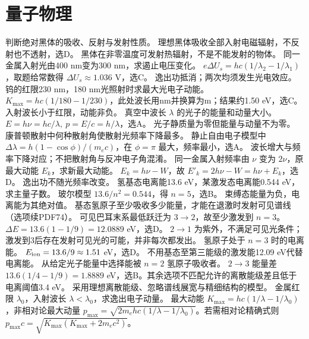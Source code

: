 \section{量子物理}
\problemtext 判断绝对黑体的吸收、反射与发射性质。
\workings 理想黑体吸收全部入射电磁辐射，不反射也不透射，选D。
\crosscheck 黑体在非零温度可发射热辐射，不是不能发射的物体。
\problemtext 同一金属入射光由400 nm变为300 nm，求遏止电压变化。
\workings $e\Delta U_s=hc(1/\lambda_2-1/\lambda_1)$，取题给常数得 $\Delta U_s\approx1.036$ V，选C。
\crosscheck 逸出功抵消；两次均须发生光电效应。
\problemtext 钨的红限230 nm，180 nm光照射时求最大光电子动能。
\workings $K_{\max}=hc(1/180-1/230)$，此处波长用nm并换算为m；结果约1.50 eV，选C。
\crosscheck 入射波长小于红限，动能非负。
\problemtext 真空中波长 $\lambda$ 的光子的能量和动量大小。
\workings $E=h\nu=hc/\lambda,\ p=E/c=h/\lambda$，选A。
\crosscheck 光子静质量为零但能量与动量不为零。
\problemtext 康普顿散射中何种散射角使散射光频率下降最多。
\workings 静止自由电子模型中 $\Delta\lambda=h(1-\cos\phi)/(m_ec)$，在 $\phi=\pi$ 最大，频率最小，选A。
\crosscheck 波长增大与频率下降对应；不把散射角与反冲电子角混淆。
\problemtext 同一金属入射频率由 $\nu$ 变为 $2\nu$，原最大动能 $E_k$，求新最大动能。
\workings $E_k=h\nu-W$，故 $E'_k=2h\nu-W=h\nu+E_k$，选D。
\crosscheck 逸出功不随光频率改变。
\problemtext 氢基态电离能13.6 eV，某激发态电离能0.544 eV，求主量子数。
\workings 玻尔模型 $13.6/n^2=0.544$，得 $n=5$，选B。
\crosscheck 束缚态能量为负，电离能为其绝对值。
\problemtext 基态氢原子至少吸收多少能量，才能在退激时发射可见谱线（选项续PDF74）。
\workings 可见巴耳末系最低跃迁为 $3\to2$，故至少激发到 $n=3$。$\Delta E=13.6(1-1/9)=12.0889$ eV，选D。
\crosscheck $2\to1$ 为紫外，不满足可见光条件；激发到3后存在发射可见光的可能，并非每次都发出。
\problemtext 氢原子处于 $n=3$ 时的电离能。
\workings $E_{\rm ion}=13.6/9\approx1.51$ eV，选D。
\crosscheck 不用基态至第三能级的激发能12.09 eV代替电离能。
\problemtext 从给定光子能量中选择能被 $n=2$ 氢原子吸收者。
\workings $2\to3$ 能量差 $13.6(1/4-1/9)=1.8889$ eV，选B。其余选项不匹配允许的离散能级差且低于电离阈值3.4 eV。
\crosscheck 采用理想离散能级、忽略谱线展宽与精细结构的模型。
\problemtext 金属红限 $\lambda_0$，入射波长 $\lambda<\lambda_0$，求逸出电子动量。
\workings 最大动能 $K_{\max}=hc(1/\lambda-1/\lambda_0)$，非相对论最大动量 $p_{\max}=\sqrt{2m_ehc(1/\lambda-1/\lambda_0)}$。若需相对论精确式则 $p_{\max}c=\sqrt{K_{\max}(K_{\max}+2m_ec^2)}$。
